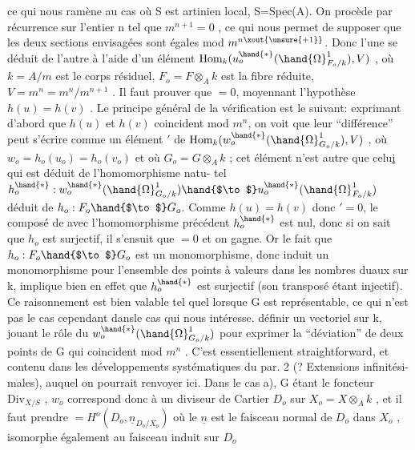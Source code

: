 
ce qui nous ramène au cas où S est artinien local, S=Spec(A). On procède
par récurrence sur l'entier n tel que $m^{n+1}=0$ , ce qui nous permet de
supposer que les deux sections envisagées  sont égales mod $m^{n\xout{\unsure{+1}}}$. Donc
l'une se déduit de l'autre à l'aide d'un élément  
$\mathrm{Hom}_k(u_o^{\hand{*}}(\hand{\Omega}^1_{F_o/k}), V)$ , où $k=A/m$ est le corps résiduel, $F_o=F\otimes_A k$ est la
fibre réduite, $V=m^n = m^n/m^{n+1}$ . Il faut prouver que \hand{$\delta$}$= 0$, moyennant
l'hypothèse $h(u)=h(v)$ . Le principe général de la vérification est le
suivant: exprimant d'abord que $h(u)$ et $h(v)$ coincident mod $m^n$, on voit
que leur ``différence'' peut s'écrire comme un élément \hand{$\delta$}$'$ de
$\mathrm{Hom}_k(w_o^{\hand{*}}(\hand{\Omega}^1_{G_o/k}),V)$ , où $w_o = h_o(u_o)=h_o(v_o)$  et où $G_o = G\otimes_A k$ ;
cet élément n'est autre que celu\uline{i} qui est déduit de  l'homomorphisme natu-%
tel $h_o^{\hand{*}} : w_o^{\hand{*}}(\hand{\Omega}^1_{G_o/k}) \hand{$\to$} u_o^{\hand{*}}(\hand{\Omega}^1_{F_o/k})$ déduit de $h_o: F_o\hand{$\to$} G_o$. Comme
$h(u)=h(v)$ donc \hand{$\delta$}$' = 0$, le composé de \hand{$\delta$} avec l'homomorphisme précédent
$h_o^{\hand{*}}$ est nul, donc si on sait que $h_o$ est surjectif, il s'ensuit que \hand{$\delta$}$=0$
et on gagne. Or le fait que $h_o:F_o\hand{$\to$} G_o$ est un monomorphisme, donc induit
un monomorphisme pour l'ensemble des points à valeurs dans les nombres
duaux sur k, implique bien en effet que $h_o^{\hand{*}}$ est surjectif (son transposé
étant injectif). Ce raisonnement est bien valable tel quel lorsque G
est représentable, ce qui n'est pas le cas cependant dansle cas qui nous
intéresse.   définir un vectoriel   sur k, jouant le rôle
du  $w_o^{\hand{*}}(\hand{\Omega}^1_{G_o/k})$ pour exprimer la ``déviation'' de deux points de G qui
coincident mod $m^n$ . C'est essentiellement straightforward, et contenu
dans les développements systématiques du par. 2 (? Extensions infinitési-%
males), auquel on pourrait renvoyer ici. Dans le cas a), G étant le
foncteur $\mathrm{Div}_{X/S}$ , $w_o$ correspond donc à un diviseur de Cartier  $D_o$ sur
$X_o = X\otimes_A k$ , et il faut prendre \hand{$\Omega$}$= H^o(D_o, \underline{n}_{D_o/X_o})$ où le $\underline{n}$ est le
faisceau normal de $D_o$ dans $X_o$ , isomorphe également au faisceau induit
sur $D_o$

